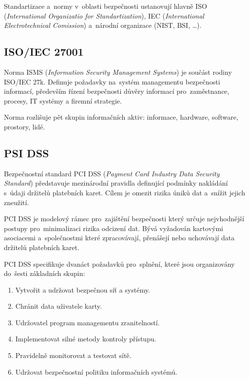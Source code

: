 Standartizace a~normy v~oblasti bezpečnosti ustanovují hlavně
ISO (\emph{International Organizatio for Standartization}),
IEC (\emph{International Electrotechnical Comission}) a~národní organizace (NIST, BSI, \dots).


\subsection{ISO/IEC 27001}

Norma ISMS (\emph{Information Security Management Systems}) je součást rodiny ISO/IEC 27k.
Definuje požadavky na~systém managementu bezpečnosti informací, především řízení bezpečnosti důvěry informací pro~zaměstnance, procesy, IT systémy a firemní strategie.

Norma rozlišuje pět skupin informačních aktiv: informace, hardware, software, prostory, lidé.


\subsection{PSI DSS}

Bezpečnostní standard PCI DSS (\emph{Payment Card Industry Data Security Standard}) představuje mezinárodní pravidla definující podmínky nakládání s~údaji držitelů platebních karet.
Cílem je omezit rizika úniků dat a~snížit jejich zneužití.

PCI DSS je modelový rámec pro~zajištění bezpečnosti který určuje nejvhodnější postupy pro~minimalizaci rizika odcizení dat.
Bývá vyžadován kartovými asociacemi a~společnostmi které zpracovávají, přenášejí nebo uchovávají data držitelů platebních karet.

PCI DSS specifikuje dvanáct požadavků pro~splnění, které jsou organizovány do~šesti základních skupin:
\vspace*{-0.5em}\begin{enumerate}
\item Vytvořit a udržovat bezpečnou síť a systémy.
\item Chránit data uživatele karty.
\item Udržovatel program managementu zranitelností.
\item Implementovat silné metody kontroly přístupu.
\item Pravidelně monitorovat a testovat sítě.
\item Udržovat bezpečnostní politiku informačních systémů.
\end{enumerate}

